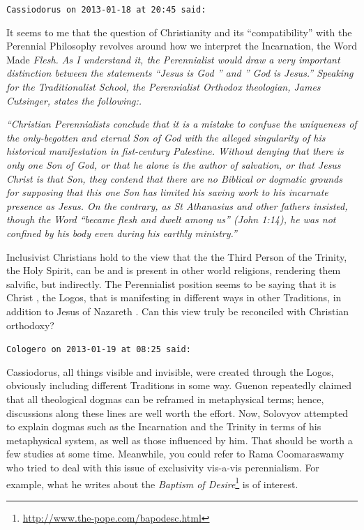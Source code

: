 \begin{footnotesize}
\begin{sffamily}
\hfill

\texttt{Cassiodorus on 2013-01-18 at 20:45 said:}

It seems to me that the question of Christianity and its ``compatibility'' with the Perennial Philosophy revolves around how we interpret the Incarnation, the Word Made \emph{Flesh. As I understand it, the Perennialist would draw a very important distinction between the statements ``Jesus is God '' and '' God is Jesus.'' Speaking for the Traditionalist School, the Perennialist Orthodox theologian, James Cutsinger, states the following:.}

\emph{``Christian Perennialists conclude that it is a mistake to confuse the uniqueness of the only-begotten and eternal Son of God with the alleged singularity of his historical manifestation in fist-century Palestine. Without denying that there is only one Son of God, or that he alone is the author of salvation, or that Jesus Christ is that Son, they contend that there are no Biblical or dogmatic grounds for supposing that this one Son has limited his saving work to his incarnate presence as Jesus. On the contrary, as St Athanasius and other fathers insisted, though the Word ``became flesh and dwelt among us'' (John 1:14), he was not confined by his body even during his earthly ministry.''}

Inclusivist Christians hold to the view that the the Third Person of the Trinity, the Holy Spirit, can be and is present in other world religions, rendering them salvific, but indirectly. The Perennialist position seems to be saying that it is Christ , the Logos, that is manifesting in different ways in other Traditions, in addition to Jesus of Nazareth . Can this view truly be reconciled with Christian orthodoxy?

\hfill

\texttt{Cologero on 2013-01-19 at 08:25 said:}

Cassiodorus, all things visible and invisible, were created through the Logos, obviously including different Traditions in some way. Guenon repeatedly claimed that all theological dogmas can be reframed in metaphysical terms; hence, discussions along these lines are well worth the effort. Now, Solovyov attempted to explain dogmas such as the Incarnation and the Trinity in terms of his metaphysical system, as well as those influenced by him. That should be worth a few studies at some time. Meanwhile, you could refer to Rama Coomaraswamy who tried to deal with this issue of exclusivity vis-a-vis perennialism. For example, what he writes about the \textit{Baptism of Desire}\footnote{\url{http://www.the-pope.com/bapodesc.html}} is of interest.


\end{sffamily}
\end{footnotesize}
